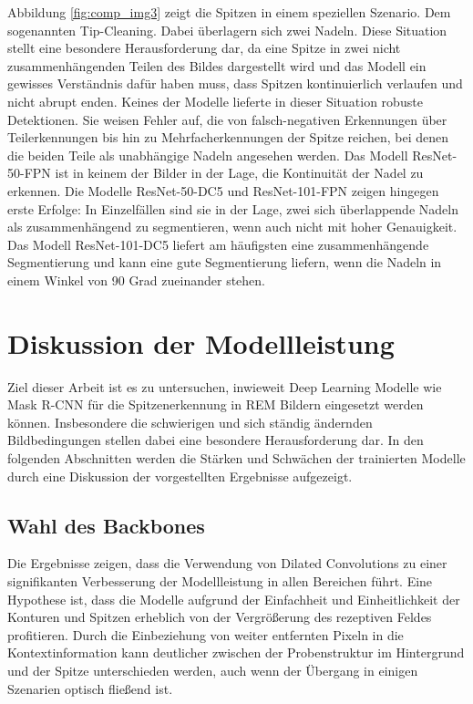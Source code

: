 Abbildung \ref{fig:comp_img3} zeigt die Spitzen in einem speziellen Szenario. Dem sogenannten Tip-Cleaning. Dabei überlagern sich zwei Nadeln. Diese Situation stellt eine besondere Herausforderung dar, da eine Spitze in zwei nicht zusammenhängenden Teilen des Bildes dargestellt wird und das Modell ein gewisses Verständnis dafür haben muss, dass Spitzen kontinuierlich verlaufen und nicht abrupt enden.
Keines der Modelle lieferte in dieser Situation robuste Detektionen. Sie weisen Fehler auf, die von falsch-negativen Erkennungen über Teilerkennungen bis hin zu Mehrfacherkennungen der Spitze reichen, bei denen die beiden Teile als unabhängige Nadeln angesehen werden. Das Modell ResNet-50-FPN ist in keinem der Bilder in der Lage, die Kontinuität der Nadel zu erkennen.
Die Modelle ResNet-50-DC5 und ResNet-101-FPN zeigen hingegen erste Erfolge: In Einzelfällen sind sie in der Lage, zwei sich überlappende Nadeln als zusammenhängend zu segmentieren, wenn auch nicht mit hoher Genauigkeit. Das Modell ResNet-101-DC5 liefert am häufigsten eine zusammenhängende Segmentierung und kann eine gute Segmentierung liefern, wenn die Nadeln in einem Winkel von 90 Grad zueinander stehen.

\chapter{Diskussion der Modellleistung}
Ziel dieser Arbeit ist es zu untersuchen, inwieweit Deep Learning Modelle wie Mask R-CNN für die Spitzenerkennung in REM Bildern eingesetzt werden können.
Insbesondere die schwierigen und sich ständig ändernden Bildbedingungen stellen dabei eine besondere Herausforderung dar.
In den folgenden Abschnitten werden die Stärken und Schwächen der trainierten Modelle durch eine Diskussion der vorgestellten Ergebnisse aufgezeigt. 
\section{Wahl des Backbones}
Die Ergebnisse zeigen, dass die Verwendung von Dilated Convolutions zu einer signifikanten Verbesserung der Modellleistung in allen Bereichen führt. Eine Hypothese ist, dass die Modelle aufgrund der Einfachheit und Einheitlichkeit der Konturen und Spitzen erheblich von der Vergrößerung des rezeptiven Feldes profitieren. Durch die Einbeziehung von weiter entfernten Pixeln in die Kontextinformation kann deutlicher zwischen der Probenstruktur im Hintergrund und der Spitze unterschieden werden, auch wenn der Übergang in einigen Szenarien optisch fließend ist.

